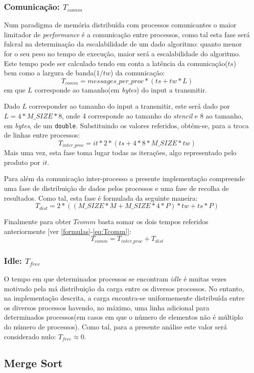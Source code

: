 \documentclass{article}
\begin{document}
\subsubsection{Comunicação: $T_{comm}$}
Num paradigma de memória distribuída com processos comunicantes
o maior limitador de \textit{performance} é a comunicação entre processos, como tal esta 
fase será fulcral na determinação da escalabilidade de um dado algoritmo: quanto menor for o seu peso no tempo de execução, maior será a escalabilidade do algoritmo. Este tempo pode ser calculado tendo em conta a latência da comunicação($ts$) bem como a largura de banda($1/tw$) da comunicação: 
$$ T_{comm} = messages\_per\_proc * (ts + tw*L) $$ 
em que $L$ corresponde ao tamanho(em \textit{bytes}) do input a transmitir.

Dado $L$ corresponder ao tamanho do input a transmitir, este será dado por $L=4*M\_SIZE*8$, 
onde 4 corresponde ao tamanho do \textit{stencil} e 8 ao tamanho, em \textit{bytes}, de 
um \texttt{double}. Substituindo os valores referidos, obtém-se, para a troca de linhas
entre processos:
$$T_{inter\_proc} = it*2*(ts+4*8*M\_SIZE*tw)$$
Mais uma vez, esta fase toma lugar todas as iterações, algo representado pelo produto
por $it$.

Para além da comunicação inter-processo a presente implementação compreende uma fase de 
distribuição de dados pelos processos e uma fase de recolha de resultados. Como tal, esta 
fase é formulada da seguinte maneira:
$$T_{dist} = 2*((M\_SIZE*M+M\_SIZE*4*P)*tw+ts*P)$$

Finalmente para obter $Tcomm$ basta somar os dois tempos referidos anteriormente [ver \ref{formulas}-\ref{eq:Tcomm}]:
$$T_{comm} = T_{inter\_proc} + T_{dist}$$


\subsubsection{Idle: $T_{free}$}
O tempo em que determinados processos se encontram \textit{idle} é muitas vezes motivado 
pela má distribuição da carga entre os diversos processos. No entanto, na implementação 
descrita, a carga encontra-se uniformemente distribuída entre os diversos processos
havendo, no máximo, uma linha adicional para determinados processos(em casos em que o 
número de elementos não é múltiplo do número de processos). Como tal, para a presente análise 
este valor será considerado nulo: 
$T_{free} \approx 0$.

\subsection{Merge Sort} \label{teoMerge}
\end{document}
